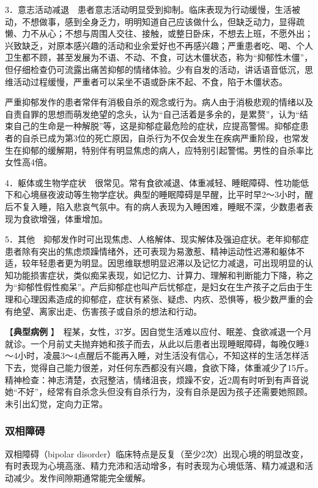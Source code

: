 3．意志活动减退　患者意志活动明显受到抑制。临床表现为行动缓慢，生活被动，不想做事，感到全身乏力，明明知道自己应该做什么，但缺乏动力，显得疏懒、力不从心；不想与周围人交往、接触，或整日卧床，不想去上班，不愿外出；兴致缺乏，对原本感兴趣的活动和业余爱好也不再感兴趣；严重患者吃、喝、个人卫生都不顾，甚至发展为不语、不动、不食，可达木僵状态，称为“抑郁性木僵”，但仔细检查仍可流露出痛苦抑郁的情绪体验。少有自发的活动，讲话语音低沉，思维活动过程缓慢，严重者可以呆坐不语或卧床不起、不食，陷于木僵状态。

严重抑郁发作的患者常伴有消极自杀的观念或行为。病人由于消极悲观的情绪以及自责自罪的思想而萌发绝望的念头，认为“自己活着是多余的，是累赘”，认为“结束自己的生命是一种解脱”等，这是抑郁症最危险的症状，应提高警惕。抑郁症患者的自杀已成为第3位的死亡原因，自杀行为不仅会发生在疾病严重阶段，也常发生在抑郁的缓解期，特别伴有明显焦虑的病人，应特别引起警惕。男性的自杀率比女性高4倍。

4．躯体或生物学症状　很常见。常有食欲减退、体重减轻、睡眠障碍、性功能低下和心境昼夜波动等生物学症状。典型的睡眠障碍是早醒，比平时早2～3小时，醒后不复入睡，陷入悲哀气氛中。有的病人表现为入睡困难，睡眠不深，少数患者表现为食欲增强，体重增加。

5．其他　抑郁发作时可出现焦虑、人格解体、现实解体及强迫症状。老年抑郁症患者除有突出的焦虑烦躁情绪外，还可表现为易激惹、精神运动性迟滞和躯体不适，较年轻患者更为明显。因思维联想明显迟滞以及记忆力减退，可出现明显的认知功能损害症状，类似痴呆表现，如记忆力、计算力、理解和判断能力下降，称之为“抑郁性假性痴呆”。产后抑郁症也叫产后忧郁症，是妇女在生产孩子之后由于生理和心理因素造成的抑郁症，症状有紧张、疑虑、内疚、恐惧等，极少数严重的会有绝望、离家出走、伤害孩子或自杀的想法和行动。

【\textbf{典型病例}
】　{程某，女性，37岁。因自觉生活难以应付、眠差、食欲减退一个月就诊。一个月前丈夫抛弃她和孩子而去，从此以后患者出现睡眠障碍，每晚仅睡3～4小时，凌晨3～4点醒后不能再入睡，对生活没有信心，不知这样的生活怎样活下去，觉得自己能力很差，对任何东西都没有兴趣，食欲下降，体重减少了15斤。精神检查：神志清楚，衣冠整洁，情绪沮丧，烦躁不安，近2周有时听到有声音说她“不好”，经常有自杀念头但没有自杀行为，没有自杀是因为孩子还需要她照顾。未引出幻觉，定向力正常。}

\subsubsection{双相障碍}

双相障碍（bipolar
disorder）临床特点是反复（至少2次）出现心境的明显改变，有时表现为心境高涨、精力充沛和活动增多，有时表现为心境低落、精力减退和活动减少。发作间隙期通常能完全缓解。

